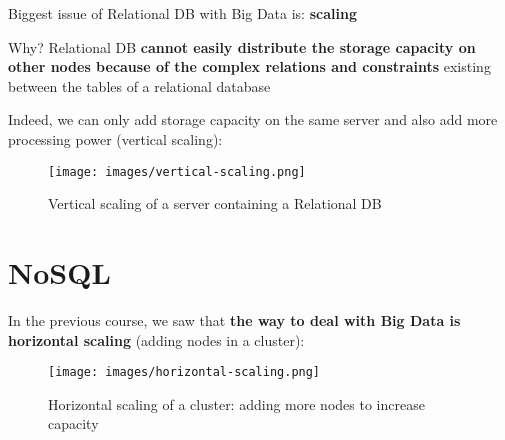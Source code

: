 \documentclass{beamer}[10pt, usepdftitle=false handout]
\begin{document}
	\begin{frame}
	Biggest issue of Relational DB with Big Data is: \textbf{scaling}
	\vspace*{0.6em}
	
	\begin{block}{Why?}
	Relational DB \textbf{cannot easily distribute the storage capacity on other nodes because of the complex relations and constraints} existing between the tables of a relational database 
	\end{block}	
	\vspace*{0.6em}
	
	Indeed, we can only add storage capacity on the same server and also add more processing power (vertical scaling):
	\vspace*{0.6em}	
	
	\begin{figure}
	\texttt{[image: images/vertical-scaling.png]} 
     	\vspace*{-0.5em}
		\caption{Vertical scaling of a server containing a Relational DB}
	\end{figure}	
	
			
	\end{frame}
	
	\section{NoSQL}
	
	\begin{frame}
	
	In the previous course, we saw that \textbf{the way to deal with Big Data is horizontal scaling} (adding nodes in a cluster):
	\vspace*{0.6em}
	
	\begin{figure}
	\texttt{[image: images/horizontal-scaling.png]} 
     	\vspace*{-0.5em}
		\caption{Horizontal scaling of a cluster: adding more nodes to increase capacity}
	\end{figure}	
	
	\end{frame}	
	
\end{document}
